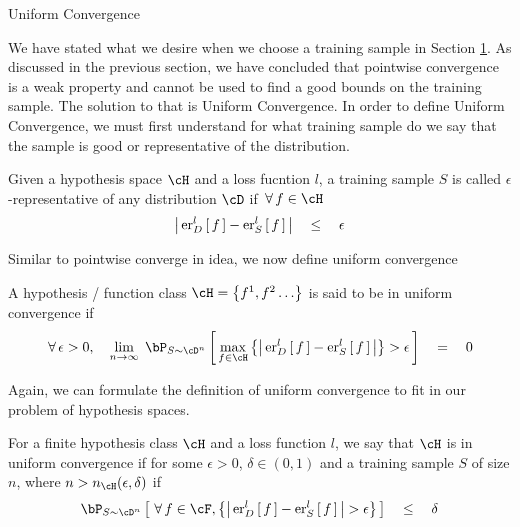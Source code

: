\documentclass{article}
\begin{document}
\begin{ssection}[3]{Uniform Convergence}

	We have stated what we desire when we choose a training sample in Section \hyperlink{sec:1}{1}. As discussed in the previous section, we have concluded that pointwise convergence is a weak property and cannot be used to find a good bounds on the training sample. The solution to that is Uniform Convergence. In order to define Uniform Convergence, we must first understand for what training sample do we say that the sample is good or representative of the distribution.

	\begin{definition}
		Given a hypothesis space $\cH$ and a loss fucntion $l$, a training sample $S$ is called $\epsilon$-representative of any distribution $\cD$ if $\qforall f \in \cH$
		\begin{equation}
			\abs{\err[_D^l]{f} - \err[_S^l]{f}}	\qle	\epsilon
		\end{equation}
		\label{eq:epsilon-representative}
	\end{definition}

	Similar to pointwise converge in idea, we now define uniform convergence

	\begin{definition}
		A hypothesis / function class $\cH = \set{f^1, f^2 \dots}$ is said to be in uniform convergence if
		\begin{equation}
			\qforall \epsilon > 0, \quad \lim_{n \ra \infty}\; \prob[S \sim \cD^n]{\max_{f \in \cH} \set{\abs{\err[_D^l]{f} - \err[_S^l]{f}}} > \epsilon}	\eq	0
		\end{equation}
	\end{definition}

	Again, we can formulate the definition of uniform convergence to fit in our problem of hypothesis spaces.

	\begin{theorem}
		For a finite hypothesis class $\cH$ and a loss function $l$, we say that $\cH$ is in uniform convergence if for some $\epsilon > 0$, $\delta \in (0, 1)$ and a training sample $S$ of size $n$, where $n > n_\cH(\epsilon, \delta)$ if
		\begin{equation}
			\prob[S \sim \cD^n]{\qforall f \in \cF, \set{\abs{\err[_D^l]{f} - \err[_S^l]{f}} > \epsilon}}	\qle	\delta
		\end{equation}
		\label{thm:uniform}
	\end{theorem}


\end{ssection}
\end{document}
